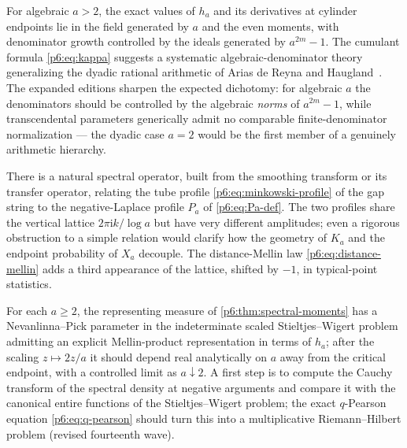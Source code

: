 \documentclass[11pt,oneside]{article}
\numberwithin{equation}{section}
\theoremstyle{definition}
\theoremstyle{remark}
\newcommand{\ii}{\mathrm i}
\begin{document}
\begin{conjecture}
For algebraic $a>2$, the exact values of $h_a$ and its derivatives at cylinder
endpoints lie in the field generated by $a$ and the even moments, with
denominator growth controlled by the ideals generated by $a^{2m}-1$.  The
cumulant formula \eqref{p6:eq:kappa} suggests a systematic
algebraic-denominator theory generalizing the dyadic rational arithmetic of
Arias de Reyna and Haugland~\cite{p6:arias-arithmetic,p6:haugland}.  The
expanded editions sharpen the expected dichotomy: for algebraic $a$ the
denominators should be controlled by the algebraic \emph{norms} of
$a^{2m}-1$, while transcendental parameters generically admit no
comparable finite-denominator normalization --- the dyadic case $a=2$
would be the first member of a genuinely arithmetic hierarchy.
\end{conjecture}

\begin{conjecture}
There is a natural spectral operator, built from the smoothing transform or
its transfer operator, relating the tube profile
\eqref{p6:eq:minkowski-profile} of the gap string to the negative-Laplace
profile $P_a$ of \eqref{p6:eq:Pa-def}.  The two profiles share the vertical
lattice $2\pi\ii k/\log a$ but have very different amplitudes; even a rigorous
obstruction to a simple relation would clarify how the geometry of $K_a$ and
the endpoint probability of $X_a$ decouple.  The distance-Mellin law
\eqref{p6:eq:distance-mellin} adds a third appearance of the lattice, shifted
by $-1$, in typical-point statistics.
\end{conjecture}

\begin{conjecture}
For each $a\ge2$, the representing measure of
\cref{p6:thm:spectral-moments} has a Nevanlinna--Pick parameter in the
indeterminate scaled Stieltjes--Wigert problem admitting an explicit
Mellin-product representation in terms of $\widehat h_a$; after the scaling
$z\mapsto2z/a$ it should depend real analytically on $a$ away from the
critical endpoint, with a controlled limit as $a\downarrow2$.  A first step
is to compute the Cauchy transform of the spectral density at negative
arguments and compare it with the canonical entire functions of the
Stieltjes--Wigert problem; the exact $q$-Pearson equation
\eqref{p6:eq:q-pearson} should turn this into a multiplicative
Riemann--Hilbert problem (revised fourteenth wave).
\end{conjecture}
\end{document}
